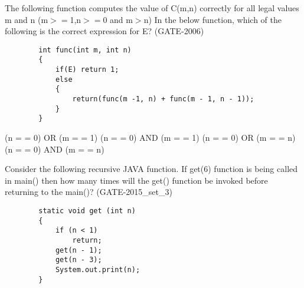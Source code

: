 

\begin{questyle}
  \question  The following function computes the value of C(m,n) correctly for all legal values m and n (m\(>=\)1,n\(>=\)0 and m\(>\)n)
            In the below function, which of the following is the correct expression for E? (GATE-2006)

    \begin{lstlisting}
        int func(int m, int n)
        {
            if(E) return 1;
            else
            {
                return(func(m -1, n) + func(m - 1, n - 1));
            }
        }
    \end{lstlisting}

  \begin{choices}
    \choice         (n = = 0) OR  (m = = 1)
    \choice         (n = = 0) AND (m = = 1)
    \CorrectChoice  (n = = 0) OR  (m = = n)
    \choice         (n = = 0) AND (m = = n)
  \end{choices}
\end{questyle}


\begin{questyle}
  \question  Consider the following recursive JAVA function. If get(6) function is being called in
            main() then how many times will the get() function be invoked before returning
            to the main()?   (GATE-2015\_set\_3)

        \begin{lstlisting}
        static void get (int n)
        {
            if (n < 1)
                return;
            get(n - 1);
            get(n - 3);
            System.out.print(n);
        }
        \end{lstlisting}

  \begin{choices}

  \end{choices}
\end{questyle}


